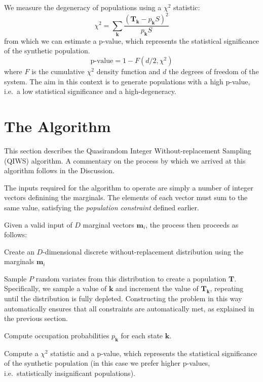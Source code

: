\documentclass{JASSS}
\begin{document}
We measure the degeneracy of populations using a \(\chi^2\) statistic:
\begin{equation}
\chi^2 = \sum\limits_{\mathbf{k}}\frac{(\mathbf{T}_\mathbf{k}-p_\mathbf{k}S)^2}{p_\mathbf{k}S}
\label{eqn:chi2}
\end{equation}
from which we can estimate a p-value, which represents the statistical
significance of the synthetic population.
\begin{equation}
\text{p-value}=1-F(d/2,\chi^2) 
\end{equation}
where \(F\) is the cumulative
\(\chi^2\) density function and \(d\) the degrees of freedom of the
system. The aim in this context is to generate populations with a high
p-value, i.e.~a low statistical significance and a high-degeneracy.

\section{The Algorithm}\label{the-algorithm}

This section describes the Quasirandom Integer Without-replacement Sampling (QIWS) algorithm. A commentary on the process by which we arrived at this algorithm follows in the Discussion.

The inputs required for the algorithm to operate are simply a number of integer vectors definining the marginals. The elements of each vector must sum to the same value, satisfying the \emph{population constraint} defined earlier.

Given a valid input of \(D\) marginal vectors \(\mathbf{m}_i\), the process then proceeds as follows:

\begin{enumerate*}
\item
  Create an \(D\)-dimensional discrete without-replacement distribution
  using the marginals \(\mathbf{m}_i\)
\item
  Sample \(P\) random variates from this distribution to create a
  population \(\mathbf{T}\). Specifically, we sample a value of
  \(\mathbf{k}\) and increment the value of \(\mathbf{T}_\mathbf{k}\),
  repeating until the distribution is fully depleted. Constructing the
  problem in this way automatically ensures that all constraints are
  automatically met, as explained in the previous section.
\item
  Compute occupation probabilities \(p_\mathbf{k}\) for each state
  \(\mathbf{k}\).
\item
  Compute a \(\chi^2\) statistic and a p-value, which represents the
  statistical significance of the synthetic population (in this case we
  prefer higher p-values, i.e.~statistically insignificant populations).
\end{enumerate*}
\end{document}
